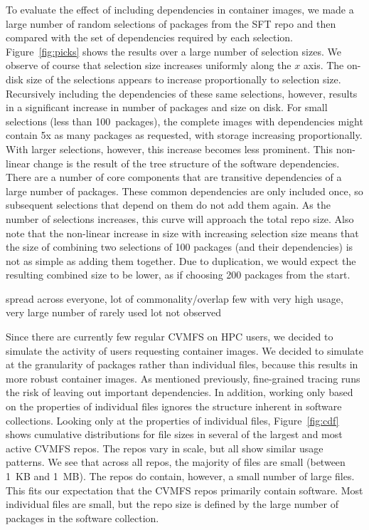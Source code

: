 \documentclass[sigconf]{acmart}
\begin{document}
To evaluate the effect of including dependencies in container images,
we made a large number of random selections of packages from the SFT repo and then compared with the set of dependencies required by each selection.
Figure~\ref{fig:picks} shows the results over a large number of selection sizes.
We observe of course that selection size increases uniformly along the $x$ axis.
The on-disk size of the selections appears to increase proportionally to selection size.
Recursively including the dependencies of these same selections,
however, results in a significant increase in number of packages and size on disk.
For small selections (less than 100~packages),
the complete images with dependencies might contain 5x as many packages as requested,
with storage increasing proportionally.
With larger selections, however,
this increase becomes less prominent.
This non-linear change is the result of the tree structure of the software dependencies.
There are a number of core components that are transitive dependencies of a large number of packages.
These common dependencies are only included once,
so subsequent selections that depend on them do not add them again.
As the number of selections increases,
this curve will approach the total repo size.
Also note that the non-linear increase in size with increasing selection size means that the size of combining two selections of 100 packages (and their dependencies) is not as simple as adding them together.
Due to duplication, we would expect the resulting combined size to be lower,
as if choosing 200 packages from the start.


spread across everyone, lot of commonality/overlap
few with very high usage, very large number of rarely used
lot not observed
\fi

Since there are currently few regular CVMFS on HPC users,
we decided to simulate the activity of users requesting container images.
We decided to simulate at the granularity of packages rather than individual files,
because this results in more robust container images.
As mentioned previously,
fine-grained tracing runs the risk of leaving out important dependencies.
In addition, working only based on the properties of individual files ignores the structure inherent in software collections.
Looking only at the properties of individual files,
Figure~\ref{fig:cdf} shows cumulative distributions for file sizes in several of the largest and most active CVMFS repos.
The repos vary in scale,
but all show similar usage patterns.
We see that across all repos,
the majority of files are small (between 1~KB and 1~MB).
The repos do contain, however,
a small number of large files.
This fits our expectation that the CVMFS repos primarily contain software.
Most individual files are small,
but the repo size is defined by the large number of packages in the software collection.
\end{document}
